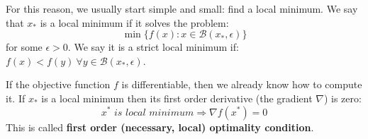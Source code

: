 \par For this reason, we usually start simple and small: find a local minimum. We say that $x_*$ is a local minimum if it solves the problem:
\begin{equation}
    \min \{f(x) : x \in \mathcal{B}(x_*,\epsilon)\}
\end{equation}
for some $\epsilon > 0$. We say it is a strict local minimum if: $f(x) < f(y)\ \forall y \in \mathcal{B}(x_*,\epsilon)$.
\par If the objective function $f$ is differentiable, then we already know how to compute it. If $x_*$ is a local minimum then its first order derivative (the gradient $\nabla$) is zero:
\begin{equation}
    x^* \textit{ is local minimum} \Rightarrow \nabla f(x^*) = 0
\end{equation}
This is called \textbf{first order (necessary, local) optimality condition}.
